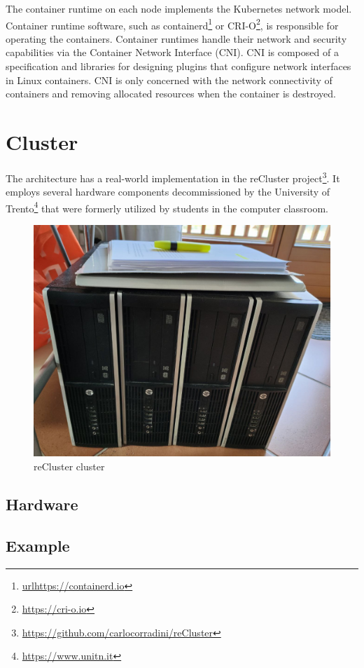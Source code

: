 The container runtime on each node implements the Kubernetes network model.
Container runtime software, such as containerd\footnote{\url{urlhttps://containerd.io}}
or CRI-O\footnote{\url{https://cri-o.io}}, is responsible for operating the
containers. Container runtimes handle their network and security capabilities via
the Container Network Interface (CNI)\cite{k8s_cluster_networking}\cite{k8s_networking_model}.
CNI is composed of a specification and libraries for designing plugins that
configure network interfaces in Linux containers. CNI is only concerned with the
network connectivity of containers and removing allocated resources when the container
is destroyed\cite{cni}.

\section{Cluster}
\label{sec:architecture_cluster}

The architecture has a real-world implementation in the reCluster project\footnote{\url{https://github.com/carlocorradini/reCluster}}.
It employs several hardware components decommissioned by the University of
Trento\footnote{\url{https://www.unitn.it}} that were formerly utilized by
students in the computer classroom.

\begin{figure}[htbp]
  \centering
  \includegraphics[width=.9\textwidth]{images/architecture/cluster.png}
  \caption{reCluster cluster}
\end{figure}

\subsection{Hardware}
\label{subsec:architecture_cluster_hardware}


\subsection{Example}
\label{subsec:architecture_cluster_example}


